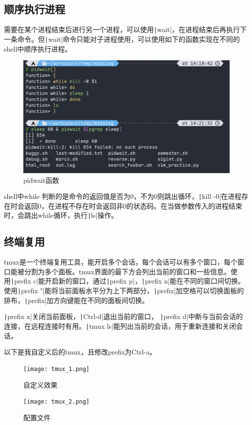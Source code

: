 \documentclass[fontset=ubuntu]{ctexart}
\begin{document}
\subsection{顺序执行进程}
需要在某个进程结束后进行另一个进程，可以使用\texttt|wait|，在进程结束后再执行下一条命令。但\texttt|wait|命令只能对子进程使用，可以使用如下的函数实现在不同的shell中顺序执行进程。
\begin{figure}[htb]
    \centering
    \includegraphics[width=0.75\linewidth]{pidwait_1.png}
    \caption{pidwait函数}
    \label{fig:pidwait_1}
\end{figure}

shell中while 判断的是命令的返回值是否为0，不为0则跳出循环，\texttt|kill -0|在进程存在时会返回0，在进程不存在时会返回非0的状态码。在当做参数传入的进程结束时，会跳出while循环，执行\texttt|ls|操作。

\subsection{终端复用}
tmux是一个终端复用工具，能开启多个会话，每个会话可以有多个窗口，每个窗口能被分割为多个面板。tmux界面的最下方会列出当前的窗口和一些信息。使用\texttt|prefix c|能开启新的窗口，通过\texttt|prefix p|，\texttt|prefix n|能在不同的窗口间切换。使用\texttt|prefix "|能将当前面板水平分为上下两部分，\texttt|prefix|加空格可以切换面板的排布，\texttt|prefix|加方向键能在不同的面板间切换。

\texttt|prefix x|关闭当前面板，\texttt|Ctrl-d|退出当前的窗口，
\texttt|prefix d|中断与当前会话的连接，在远程连接时有用。\texttt|tmux ls|能列出当前的会话，用于重新连接和关闭会话。

以下是我自定义后的tmux，且修改prefix为Ctrl-a。
\begin{figure}[htb]
    \centering
    \texttt{[image: tmux\_1.png]}
    \caption{自定义效果}
    \label{fig:tmux_1}
\end{figure}
\begin{figure}[htb]
    \centering
    \texttt{[image: tmux\_2.png]}
    \caption{配置文件}
    \label{fig:tmux_2}
\end{figure}
\end{document}
